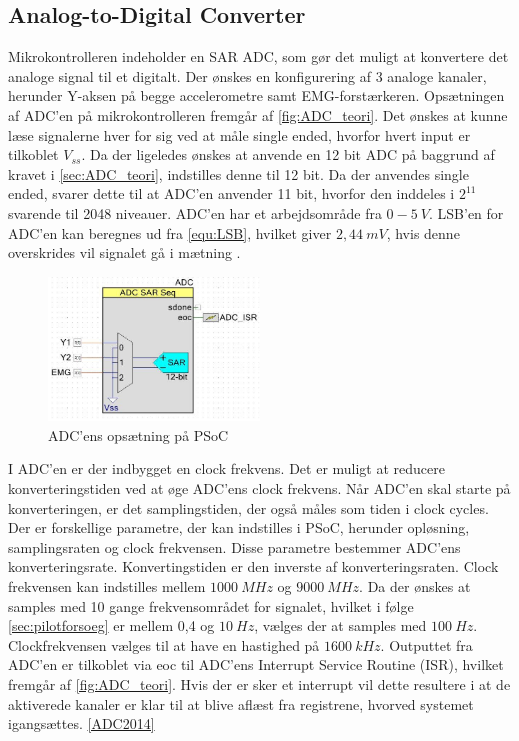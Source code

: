 \subsection{Analog-to-Digital Converter}
Mikrokontrolleren indeholder en SAR ADC, som gør det muligt at konvertere det analoge signal til et digitalt. Der ønskes en konfigurering af 3 analoge kanaler, herunder Y-aksen på begge accelerometre samt EMG-forstærkeren. Opsætningen af ADC'en på mikrokontrolleren fremgår af \autoref{fig:ADC_teori}. Det ønskes at kunne læse signalerne hver for sig ved at måle single ended, hvorfor hvert input er tilkoblet $V_{ss}$. Da der ligeledes ønskes at anvende en 12 bit ADC på baggrund af kravet i \autoref{sec:ADC_teori}, indstilles denne til 12 bit. Da der anvendes single ended, svarer dette til at ADC'en anvender 11 bit, hvorfor den inddeles i $2^{11}$ svarende til 2048 niveauer. ADC'en har et arbejdsområde fra $0-5~V$. LSB'en for ADC'en kan beregnes ud fra \autoref{equ:LSB}, hvilket giver $2,44~mV$, hvis denne overskrides vil signalet gå i mætning \citep{ADC2014}. 


\begin{figure}[H]
\centering
\includegraphics[width=0.5\textwidth]{figures/implementering/ADC_imp.jpg}
\caption{ADC'ens opsætning på PSoC}
\label{fig:ADC_teori}
\end{figure}

I ADC'en er der indbygget en clock frekvens. Det er muligt at reducere konverteringstiden ved at øge ADC'ens clock frekvens. Når ADC'en skal starte på konverteringen, er det samplingstiden, der også måles som tiden i clock cycles. Der er forskellige parametre, der kan indstilles i PSoC, herunder opløsning, samplingsraten og clock frekvensen. Disse parametre bestemmer ADC'ens konverteringsrate. Konvertingstiden er den inverste af konverteringsraten. Clock frekvensen kan indstilles mellem $1000~MHz$ og $9000~MHz$.\citep{cypresspsoc42014} Da der ønskes at samples med 10 gange frekvensområdet for signalet, hvilket i følge  \autoref{sec:pilotforsoeg} er mellem 0,4 og $10~Hz$, vælges der at samples med $100~Hz$. Clockfrekvensen vælges til at have en hastighed på $1600~kHz$. Outputtet fra ADC'en er tilkoblet via eoc til ADC'ens Interrupt Service Routine (ISR), hvilket fremgår af \autoref{fig:ADC_teori}. Hvis der er sker et interrupt vil dette resultere i at de aktiverede kanaler er klar til at blive aflæst fra registrene, hvorved systemet igangsættes. \autoref{ADC2014} 


